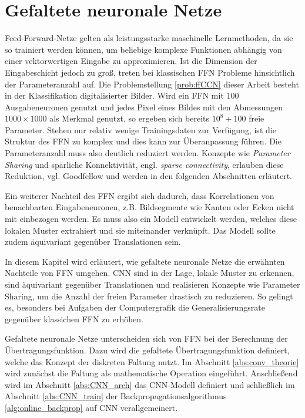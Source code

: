 \chapter{Gefaltete neuronale Netze}
\label{kap:CNN}

Feed-Forward-Netze gelten als leistungsstarke maschinelle Lernmethoden, da sie so trainiert werden können, um beliebige komplexe Funktionen abhängig von einer vektorwertigen Eingabe zu approximieren. Ist die Dimension der Eingabeschicht jedoch zu groß, treten bei klassischen FFN Probleme hinsichtlich der Parameteranzahl auf. Die Problemstellung \ref{prob:ffCCN} dieser Arbeit besteht in der Klassifikation digitalisierter Bilder. Wird ein FFN mit $100$ Ausgabeneuronen genutzt und jedes Pixel eines Bildes mit den Abmessungen $1000 \times 1000$ als Merkmal genutzt, so ergeben sich bereits $10^8+100$ freie Parameter. Stehen nur relativ wenige Trainingsdaten zur Verfügung, ist die Struktur des FFN zu komplex und dies kann zur Überanpassung führen\cite{caruana2000overfitting,bilbao2017overfitting}. Die Parameteranzahl muss also deutlich reduziert werden. Konzepte wie \textit{Parameter Sharing} und spärliche Konnektivität, engl. \textit{sparse connectivity}, erlauben diese Reduktion, vgl. Goodfellow\cite{Goodfellow-et-al-2016} und werden in den folgenden Abschnitten erläutert.

Ein weiterer Nachteil des FFN ergibt sich dadurch, dass Korrelationen von benachbarten Eingabeneuronen, z.B. Bildsegmente wie Kanten oder Ecken nicht mit einbezogen werden. Es muss also ein Modell entwickelt werden, welches diese lokalen Muster extrahiert und sie miteinander verknüpft. Das Modell sollte zudem äquivariant gegenüber Translationen sein. 


In diesem Kapitel wird erläutert, wie gefaltete neuronale Netze die erwähnten Nachteile von FFN umgehen. CNN sind in der Lage, lokale Muster zu erkennen, sind äquivariant gegenüber Translationen und realisieren Konzepte wie Parameter Sharing, um die Anzahl der freien Parameter drastisch zu reduzieren. So gelingt es, besonders bei Aufgaben der Computergrafik\cite{DBLP:conf/nips/KrizhevskySH12, DBLP:journals/pieee/LeCunBBH98,DBLP:conf/cvpr/CiresanMS12} die Generalisierungsrate gegenüber klassichen FFN zu erhöhen. 

Gefaltete neuronale Netze unterscheiden sich von FFN bei der Berechnung der Übertragungsfunktion. Dazu wird die gefaltete Übertragungsfunktion definiert, welche das Konzept der diskreten Faltung nutzt. Im Abschnitt \ref{abs:conv_theorie} wird zunächst die Faltung als mathematische Operation eingeführt. 
Anschließend wird im Abschnitt \ref{abs:CNN_arch} das CNN-Modell definiert und schließlich im Abschnitt \ref{abs:CNN_train} der Backpropagationsalgorithmus \ref{alg:online_backprop} auf CNN verallgemeinert.

